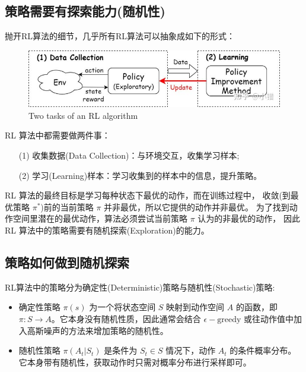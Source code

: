 \subsection{策略需要有探索能力(随机性)}

抛开RL算法的细节，几乎所有RL算法可以抽象成如下的形式：
\begin{figure}[ht]
\centering
\includegraphics[scale=0.5]{pix/exploration.jpg}
\caption{Two tasks of an RL algorithm}
\end{figure}

RL 算法中都需要做两件事：
\begin{itemize}
\setlength{\parskip}{0pt}
\item[(1)]
收集数据(Data Collection)：与环境交互，收集学习样本; 
\item[(2)]
学习(Learning)样本：学习收集到的样本中的信息，提升策略。
\end{itemize}

RL 算法的最终目标是学习每种状态下最优的动作，而在训练过程中，
收敛(到最优策略 $\pi^*$)前的当前策略 $\pi$ 并非最优，所以它提供的动作并非最优。
为了找到动作空间里潜在的最优动作，算法必须尝试当前策略 $\pi$ 认为的非最优的动作，
因此 RL 算法中的策略需要有随机探索(Exploration)的能力。

\subsection{策略如何做到随机探索}

RL算法中的策略分为确定性(Deterministic)策略与随机性(Stochastic)策略:
\begin{itemize}
\setlength{\parskip}{0pt}
\item
确定性策略 $\pi(s)$ 为一个将状态空间 $S$ 映射到动作空间 $A$ 的函数，即 
$\pi : S \rightarrow A$。它本身没有随机性质，因此通常会结合 $\epsilon-\text{greedy}$ 
或往动作值中加入高斯噪声的方法来增加策略的随机性。
\item
随机性策略 $\pi(A_t | S_t)$ 是条件为 $S_t \in S$ 情况下，动作 $A_t$ 的条件概率分布。
它本身带有随机性，获取动作时只需对概率分布进行采样即可。
\end{itemize}

